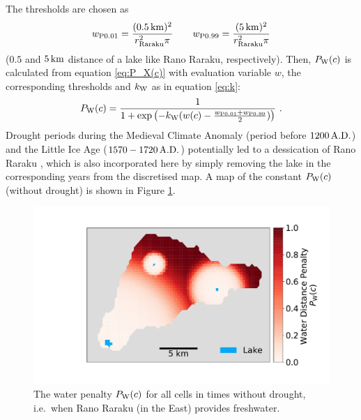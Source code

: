 The thresholds are chosen as 
\begin{equation}
w_{\rm P0.01} = \frac{(0.5\, {\rm km})^2}{r_\text{Raraku}^2\pi} \qquad
 w_{\rm P0.99}=\frac{(5\, {\rm km})^2}{r_\text{Raraku}^2\pi}
\end{equation} 
($0.5$ and $5\, {\rm km}$ distance of a lake like Rano Raraku, respectively).
Then, $P_{\rm W}(c)$ is calculated from equation \ref{eq:P_X(c)} with evaluation variable $w$, the corresponding thresholds and $k_{\rm W}$ as in equation \ref{eq:k}:
\begin{equation}
	P_{\rm W}(c) = \frac{1}{1+\exp\left( - k_{\rm W} (w(c)-\frac{w_{\rm P0.01}+w_{\rm P0.99}}{2}) \right)} \ .
\end{equation}
Drought periods during the Medieval Climate Anomaly (period before $1200\, {\rm A.D.}$) and the Little Ice Age ($1570-1720 \, {\rm A.D.}$) potentially led to a dessication of Rano Raraku \citep{Rull2020}, which is also incorporated here by simply removing the lake in the corresponding years from the discretised map. 
A map of the constant $P_{\rm W}(c)$ (without drought) is shown in Figure \ref{fig:plotpw}. 
\begin{figure}
	\centering
	\includegraphics[width=1\linewidth]{images/Plot_PW}
	\caption{The water penalty $P_{\rm W}(c)$ for all cells in times without drought, i.e.\ when Rano Raraku (in the East) provides freshwater.}
	\label{fig:plotpw}
\end{figure}


